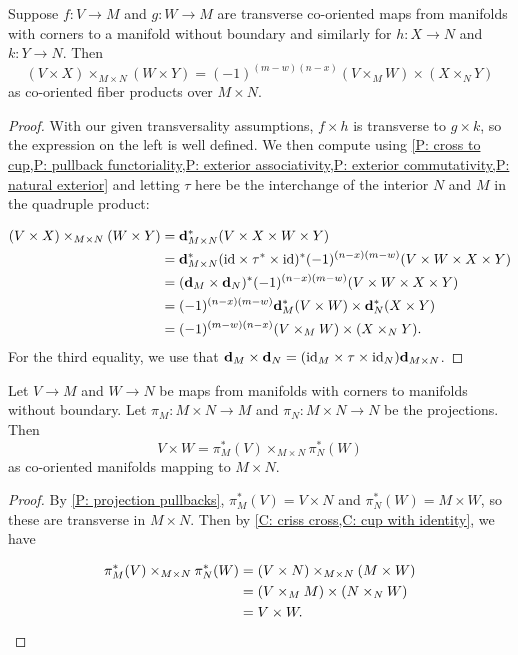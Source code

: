 \begin{corollary}\label{C: criss cross}
	Suppose $f \colon V \to M$ and $g \colon W \to M$ are transverse co-oriented maps from manifolds with corners to a manifold without boundary and similarly for $h \colon X \to N$ and $k \colon Y \to N$.
	Then $$(V \times X)\times_{M \times N} (W \times Y) = (-1)^{(m-w)(n-x)} (V \times_M W) \times (X \times_N Y) $$
	as co-oriented fiber products over $M \times N$.
\end{corollary}
\begin{proof}
	With our given transversality assumptions, $f \times h$ is transverse to $g \times k$, so the expression on the left is well defined.
	We then compute using \cref{P: cross to cup,P: pullback functoriality,P: exterior associativity,P: exterior commutativity,P: natural exterior} and letting $\tau$ here be the interchange of the interior $N$ and $M$ in the quadruple product:

	\begin{align*}
		(V \times X)\times_{M \times N} (W \times Y)& = \mathbf{d}_{M \times N}^*(V \times X \times W \times Y)\\
		& = \mathbf{d}_{M \times N}^*(\mathrm{id} \times \tau^* \times \mathrm{id})^*(-1)^{(n-x)(m-w)}(V \times W \times X \times Y)\\
		& = (\mathbf{d}_M \times \mathbf{d}_N)^*(-1)^{(n-x)(m-w)}(V \times W \times X \times Y)\\
		& = (-1)^{(n-x)(m-w)}\mathbf{d}_M^*(V \times W) \times \mathbf{d}_N^*( X \times Y)\\
		& = (-1)^{(m-w)(n-x)} (V \times_M W) \times (X \times_N Y).
	\end{align*}
	For the third equality, we use that $\mathbf{d}_M \times \mathbf{d}_N = (\mathrm{id}_M \times \tau \times \mathrm{id}_N)\mathbf{d}_{M \times N}$.
\end{proof}

\begin{corollary}\label{C: cross is cup}
	Let $V \to M$ and $W \to N$ be maps from manifolds with corners to manifolds without boundary.
	Let $\pi_M \colon M \times N \to M$ and $\pi_N \colon M \times N \to N$ be the projections.
	Then $$V \times W = \pi_M^*(V)\times_{M \times N}\pi_N^*(W)$$ as co-oriented manifolds mapping to $M \times N$.
\end{corollary}

\begin{proof}
	By \cref{P: projection pullbacks}, $\pi_M^*(V) = V \times N$ and $\pi_N^*(W) = M \times W$, so these are transverse in $M \times N$.
	Then by \cref{C: criss cross,C: cup with identity}, we have

	\begin{align*}
		\pi_M^*(V)\times_{M \times N}\pi_N^*(W)& = (V \times N)\times_{M \times N} (M \times W)\\
		& = (V \times_M M) \times (N \times_N W)\\
		& = V \times W.\qedhere
	\end{align*}
\end{proof}

